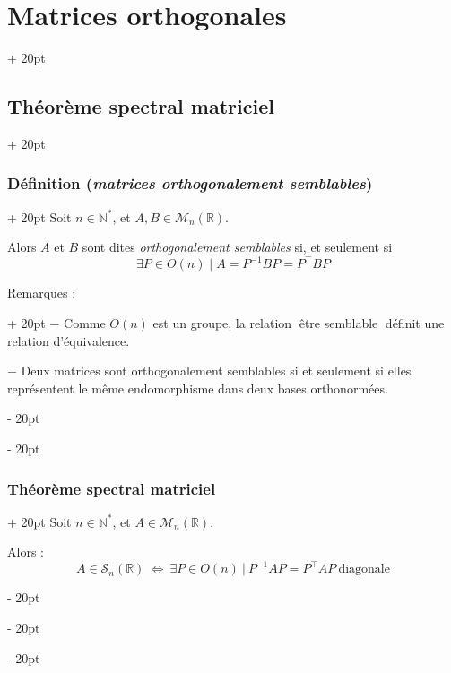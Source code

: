 \documentclass[a4paper, 12pt, twoside]{article}
\newcommand{\N}{\mathbb{N}} %
\newcommand{\R}{\mathbb{R}} %
\newcommand{\ssi}{\ \Leftrightarrow \ }
\newcommand{\simplecit}[1]{\guillemotleft$\;$#1$\;$\guillemotright}
\newcommand{\ind}[1][20pt]{\advance\leftskip + #1}
\newcommand{\deind}[1][20pt]{\advance\leftskip - #1}
\newenvironment{indt}[2][20pt]{#2 \par \ind[#1]}{\par \deind} %
\begin{document}
\begin{indt}{\section{Matrices orthogonales}}
        \begin{indt}{\subsection{Théorème spectral matriciel}}
            \begin{indt}{\subsubsection{Définition (\textit{matrices orthogonalement semblables})}}
                Soit $n \in \N^*$, et $A, B \in \mathcal M_n(\R)$.

                Alors $A$ et $B$ sont dites \emph{orthogonalement semblables} si, et seulement si
                \[
                    \exists P \in O(n) \mid A = P^{-1}BP = P^\top B P
                \]

                \vspace{6pt}
                
                \begin{indt}{Remarques :}
                    $-$ Comme $O(n)$ est un groupe, la relation \simplecit{être semblable} définit une relation d'équivalence.

                    $-$ Deux matrices sont orthogonalement semblables si et seulement si elles représentent le même endomorphisme dans deux bases orthonormées.
                \end{indt}
            \end{indt}

            \vspace{12pt}
            
            \begin{indt}{\subsubsection{Théorème spectral matriciel}}
                Soit $n \in \N^*$, et $A \in \mathcal M_n(\R)$.

                Alors :
                \[
                    A \in \mathscr S_n(\R)
                    \ssi
                    \exists P \in O(n)\ |\ P^{-1} A P = P^\top A P\ \text{diagonale}
                \]
            \end{indt}
        \end{indt}
    \end{indt}

    \vspace{12pt}
    
\end{document}
